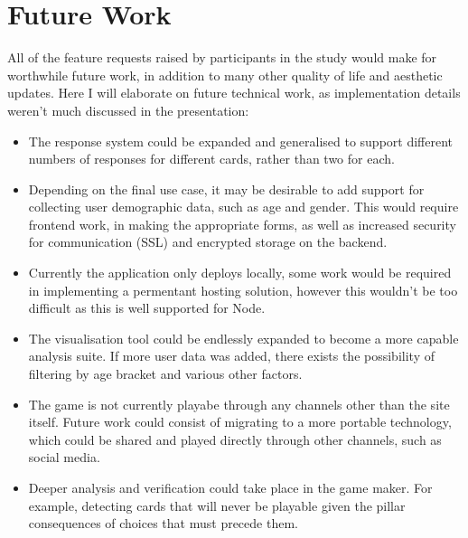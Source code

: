 \section{Future Work}
All of the feature requests raised by participants in the study would make for worthwhile future work, in addition to many other quality of life and aesthetic updates. Here I will elaborate on future technical work, as implementation details weren't much discussed in the presentation:

\begin{itemize}
    \item The response system could be expanded and generalised to support different numbers of responses for different cards, rather than two for each.
    \item Depending on the final use case, it may be desirable to add support for collecting user demographic data, such as age and gender. This would require frontend work, in making the appropriate forms, as well as increased security for communication (SSL) and encrypted storage on the backend.
    \item Currently the application only deploys locally, some work would be required in implementing a permentant hosting solution, however this wouldn't be too difficult as this is well supported for Node.
    \item The visualisation tool could be endlessly expanded to become a more capable analysis suite. If more user data was added, there exists the possibility of filtering by age bracket and various other factors.
    \item The game is not currently playabe through any channels other than the site itself. Future work could consist of migrating to a more portable technology, which could be shared and played directly through other channels, such as social media.
    \item Deeper analysis and verification could take place in the game maker. For example, detecting cards that will never be playable given the pillar consequences of choices that must precede them.
\end{itemize}